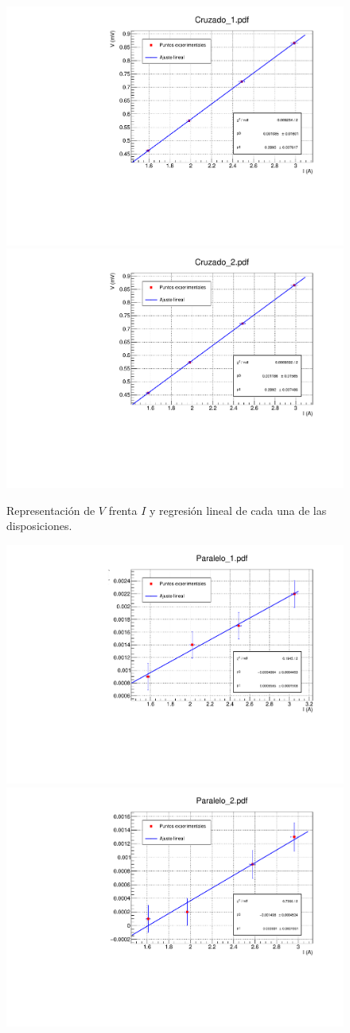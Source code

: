 \documentclass[11pt]{article}
\begin{document}
\begin{figure}[h!]
	\caption{Representación de $V$ frenta $I$ y regresión lineal de cada una de las disposiciones.}
	\label{Fig:03}
	\includegraphics[width=0.5\linewidth]{Programas/Cruzado_1.pdf} \hfill
	\includegraphics[width=0.5\linewidth]{Programas/Cruzado_2.pdf}
\end{figure}
\begin{figure}[h!]
	\includegraphics[width=0.5\linewidth]{Programas/Paralelo_1.pdf} \hfill
	\includegraphics[width=0.5\linewidth]{Programas/Paralelo_2.pdf}
\end{figure}
\end{document}
